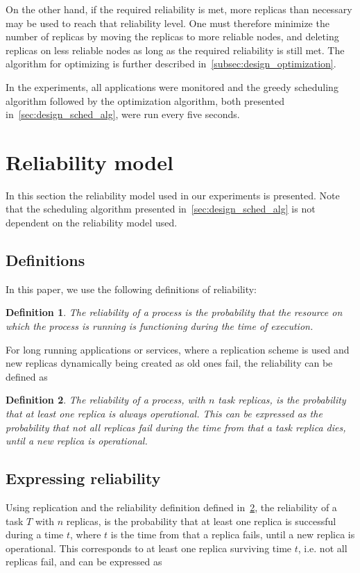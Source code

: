 \documentclass{cslthse-msc}
\newtheorem{definition}{Definition}[chapter]
\begin{document}
On the other hand, if the required reliability is met, more replicas than necessary may be used to reach that reliability level. One must therefore minimize the number of replicas by moving the replicas to more reliable nodes, and deleting replicas on less reliable nodes as long as the required reliability is still met. The algorithm for optimizing is further described in~\cref{subsec:design_optimization}.

In the experiments, all applications were monitored and the greedy scheduling algorithm followed by the optimization algorithm, both presented in~\cref{sec:design_sched_alg}, were run every five seconds.

\section{Reliability model} \label{sec:design_reliability_model}
In this section the reliability model used in our experiments is presented. Note that the scheduling algorithm presented in~\cref{sec:design_sched_alg} is not dependent on the reliability model used.

\subsection{Definitions} \label{subsec:design_definitions}
In this paper, we use the following definitions of reliability:
\begin{definition} \label{def:single_task_reliability}
The reliability of a process is the probability that the resource on which the process is running is functioning during the time of execution.
\end{definition}

For long running applications or services, where a replication scheme is used and new replicas dynamically being created as old ones fail, the reliability can be defined as \cite{effTaskReplMobGrid}

\begin{definition} \label{def:task_replica_reliability}
The reliability of a process, with $n$ task replicas, is the probability that at least one replica is always operational. This can be expressed as the probability that not all replicas fail during the time from that a task replica dies, until a new replica is operational.
\end{definition}

\subsection{Expressing reliability}\label{subsec:design_reliability}
Using replication and the reliability definition defined in~\cref{def:task_replica_reliability}, the reliability of a task $T$ with $n$ replicas, is the probability that at least one replica is successful during a time $t$, where $t$ is the time from that a replica fails, until a new replica is operational. This corresponds to at least one replica surviving time $t$, i.e. not all replicas fail, and can be expressed as 
\end{document}
